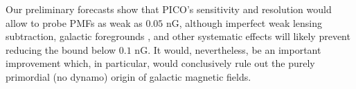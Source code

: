 \documentclass[article,aps,nofootinbib]{revtex4}
\begin{document}
Our preliminary forecasts show that PICO's sensitivity and resolution would allow to probe PMFs as weak as $0.05$ nG, although imperfect weak lensing subtraction, galactic foregrounds \cite{Oppermann:2011td,De:2013dra,Pogosian:2013dya}, and other systematic effects will likely prevent reducing the bound below $0.1$ nG. It would, nevertheless, be an important improvement which, in particular, would conclusively rule out the purely primordial (no dynamo) origin of galactic magnetic fields.
\end{document}
